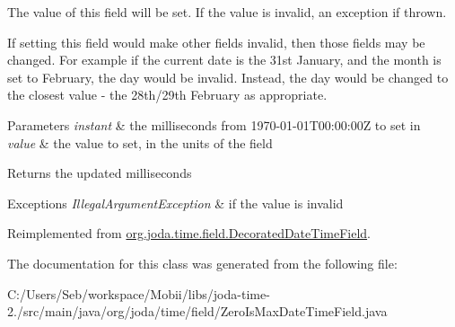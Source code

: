 The value of this field will be set. If the value is invalid, an exception if thrown. 

If setting this field would make other fields invalid, then those fields may be changed. For example if the current date is the 31st January, and the month is set to February, the day would be invalid. Instead, the day would be changed to the closest value -\/ the 28th/29th February as appropriate.


\begin{DoxyParams}{Parameters}
{\em instant} & the milliseconds from 1970-\/01-\/01\-T00\-:00\-:00\-Z to set in \\
\hline
{\em value} & the value to set, in the units of the field \\
\hline
\end{DoxyParams}
\begin{DoxyReturn}{Returns}
the updated milliseconds 
\end{DoxyReturn}

\begin{DoxyExceptions}{Exceptions}
{\em Illegal\-Argument\-Exception} & if the value is invalid \\
\hline
\end{DoxyExceptions}


Reimplemented from \hyperlink{classorg_1_1joda_1_1time_1_1field_1_1_decorated_date_time_field_a2c48e6d5c609215a6b33049feb869f7a}{org.\-joda.\-time.\-field.\-Decorated\-Date\-Time\-Field}.



The documentation for this class was generated from the following file\-:\begin{DoxyCompactItemize}
\item 
C\-:/\-Users/\-Seb/workspace/\-Mobii/libs/joda-\/time-\/2./src/main/java/org/joda/time/field/Zero\-Is\-Max\-Date\-Time\-Field.\-java\end{DoxyCompactItemize}
